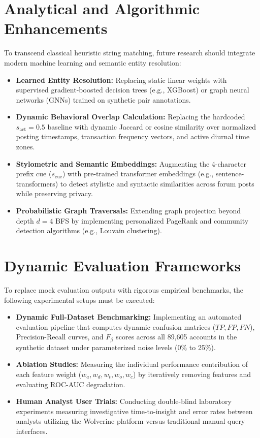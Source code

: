 \section{Analytical and Algorithmic Enhancements}
\label{sec:future-analytics}
To transcend classical heuristic string matching, future research should integrate modern machine learning and semantic entity resolution:
\begin{itemize}
    \item \textbf{Learned Entity Resolution:} Replacing static linear weights with supervised gradient-boosted decision trees (e.g., XGBoost) or graph neural networks (GNNs) trained on synthetic pair annotations.
    \item \textbf{Dynamic Behavioral Overlap Calculation:} Replacing the hardcoded $s_{\text{act}} = 0.5$ baseline with dynamic Jaccard or cosine similarity over normalized posting timestamps, transaction frequency vectors, and active diurnal time zones.
    \item \textbf{Stylometric and Semantic Embeddings:} Augmenting the 4-character prefix cue ($s_{\text{cue}}$) with pre-trained transformer embeddings (e.g., sentence-transformers) to detect stylistic and syntactic similarities across forum posts while preserving privacy.
    \item \textbf{Probabilistic Graph Traversals:} Extending graph projection beyond depth $d = 4$ BFS by implementing personalized PageRank and community detection algorithms (e.g., Louvain clustering).
\end{itemize}

\section{Dynamic Evaluation Frameworks}
\label{sec:future-evaluation}
To replace mock evaluation outputs with rigorous empirical benchmarks, the following experimental setups must be executed:
\begin{itemize}
    \item \textbf{Dynamic Full-Dataset Benchmarking:} Implementing an automated evaluation pipeline that computes dynamic confusion matrices ($TP, FP, FN$), Precision-Recall curves, and $F_\beta$ scores across all 89,605 accounts in the synthetic dataset under parameterized noise levels (0\% to 25\%).
    \item \textbf{Ablation Studies:} Measuring the individual performance contribution of each feature weight ($w_a, w_d, w_t, w_o, w_c$) by iteratively removing features and evaluating ROC-AUC degradation.
    \item \textbf{Human Analyst User Trials:} Conducting double-blind laboratory experiments measuring investigative time-to-insight and error rates between analysts utilizing the Wolverine platform versus traditional manual query interfaces.
\end{itemize}

